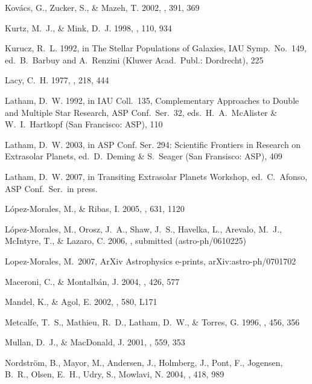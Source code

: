 \documentclass[12pt, preprint]{aastex}
\begin{document}
\begin{thebibliography}{}
Kov{\'a}cs, G., Zucker, S., \& Mazeh, T.
2002, \aap, 391, 369

Kurtz, M.\ J., \& Mink, D.\ J.
1998, \pasp, 110, 934

Kurucz, R.\ L.
1992, in The Stellar Populations of Galaxies, IAU Symp.\ No.\ 149,
ed.\ B.\ Barbuy and A.\ Renzini (Kluwer Acad.\ Publ.: Dordrecht), 225

Lacy, C.\ H.
1977, \apj, 218, 444 

Latham, D.\ W.
1992, in IAU Coll.\ 135, Complementary Approaches to Double and
Multiple Star Research, ASP Conf.\ Ser.\ 32, eds.\ H.\ A.\ McAlister
\& W.\ I.\ Hartkopf (San Francisco: ASP), 110

Latham, D.\ W.
2003, in ASP Conf. Ser. 294: Scientific Frontiers in Research on
Extrasolar Planets, ed.\ D.\ Deming \& S.\ Seager (San Fransisco: ASP),
409

Latham, D.\ W.
2007, in Transiting Extrasolar Planets Workshop, ed.\ C.\ Afonso, ASP
Conf.\ Ser.\ in press.

L\'{o}pez-Morales, M., \& Ribas, I.
2005, \apj, 631, 1120

L\'{o}pez-Morales, M., Orosz, J.\ A., Shaw, J.\ S., Havelka, L.,
Arevalo, M.\ J., McIntyre, T., \& Lazaro, C.
2006, \apj, submitted (astro-ph/0610225)

 Lopez-Morales, M.\ 2007, 
ArXiv Astrophysics e-prints, arXiv:astro-ph/0701702

Maceroni, C., \& Montalb\'{a}n, J.
2004, \aap, 426, 577 

Mandel, K., \& Agol, E.
2002, \apjl, 580, L171 

Metcalfe, T.\ S., Mathieu, R.\ D., Latham, D.\ W., \& Torres, G.
1996, \apj, 456, 356

Mullan, D.\ J., \& MacDonald, J.
2001, \apj, 559, 353 

Nordstr\"om, B., Mayor, M., Andersen, J., Holmberg, J., Pont, F.,
J\/ogensen, B.\ R., Olsen, E.\ H., Udry, S., Mowlavi, N.
2004, \aap, 418, 989


\end{thebibliography}
\end{document}
